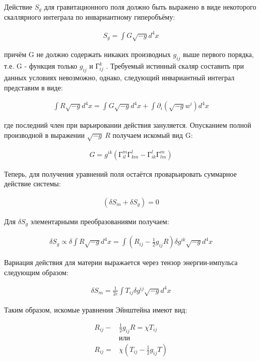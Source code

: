 \documentclass{article}
\begin{document}
		Действие $ S_g $ для гравитационного поля должно быть выражено в виде некоторого скаллярного интеграла по инвариантному гиперобъёму:

		\begin{align*}
			S_g = \int G \sqrt{-g} d^4 x
		\end{align*}

		причём G не должно содержать никаких производных $ g_{ij} $ выше первого порядка, т.е. G - функция только $ g_{ij} $ и $ Г_{ij}^k $ . Требуемый истинный скаляр составить при данных условиях невозможно, однако, следующий инвариантный интеграл представим в виде:

		\begin{align*}
			\int R \sqrt{-g} d^4 x = \int G \sqrt{-g} d^4 x + \int \partial_i ( \sqrt{-g} w^i ) d^4 x
		\end{align*}

		где последний член при варьировании действия зануляется. Опусканием полной производной в выражении $ \sqrt{-g} \: R $ получаем искомый вид G:

		\begin{align*}
			G = g^{ik} ( Г_{il}^m Г_{km}^l - Г_{ik}^l Г_{lm}^m )
		\end{align*}

		Теперь, для получения уравнений поля остаётся проварьировать суммарное действие системы:

		\begin{align*}
			( \delta S_m + \delta S_g ) = 0
		\end{align*}

		Для $ \delta S_g $ элементарными преобразованиями получаем:

		\begin{align*}
			\delta S_g \propto \delta \int R \sqrt{-g} d^4 x =  \int ( R_{ij} - \frac{1}{2} g_{ij} R) \delta g^{ik} \sqrt{-g} d^4 x
		\end{align*}


		Вариация действия для материи выражается через тензор энергии-импульса следующим образом: 

		\begin{align*}
			\delta S_m = \frac{1}{2c} \int T_{ij} \delta g^{ij} \sqrt{-g} d^4 x
		\end{align*}

		Таким образом, искомые уравнения Эйнштейна имеют вид:

		\begin{align*}
			R_{ij} - & \frac{1}{2} g_{ij} R = \chi T_{ij} \\
			& или               \\
			R_{ij} = & \chi ( T_{ij} - \frac{1}{2} g_{ij} T )
		\end{align*}
\end{document}
